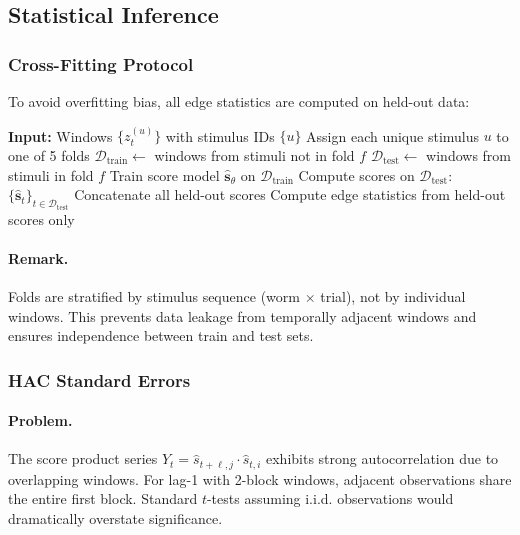 \documentclass{article}
\theoremstyle{plain}
\theoremstyle{definition}
\theoremstyle{remark}
\newcommand{\1}{\mathbf{1}}
\begin{document}
\subsection{Statistical Inference}
\label{app:inference}

\subsubsection{Cross-Fitting Protocol}

To avoid overfitting bias, all edge statistics are computed on held-out data:

\begin{algorithm}[h!]
\caption{5-Fold Cross-Fitting}
\label{alg:crossfit}
\begin{center}
\begin{minipage}{0.85\textwidth}
\begin{algorithmic}[1]
\scriptsize
\STATE \textbf{Input:} Windows $\{z_t^{(u)}\}$ with stimulus IDs $\{u\}$
\STATE Assign each unique stimulus $u$ to one of 5 folds
    \STATE $\mathcal{D}_{\mathrm{train}} \gets$ windows from stimuli not in fold $f$
    \STATE $\mathcal{D}_{\mathrm{test}} \gets$ windows from stimuli in fold $f$
    \STATE Train score model $\widehat{\bm{s}}_\theta$ on $\mathcal{D}_{\mathrm{train}}$
    \STATE Compute scores on $\mathcal{D}_{\mathrm{test}}$: $\{\widehat{\bm{s}}_t\}_{t \in \mathcal{D}_{\mathrm{test}}}$
\ENDFOR
\STATE Concatenate all held-out scores
\STATE Compute edge statistics from held-out scores only
\end{algorithmic}
\end{minipage}
\end{center}
\end{algorithm}

\paragraph{Remark.} Folds are stratified by stimulus sequence (worm $\times$ trial), not by individual windows. This prevents data leakage from temporally adjacent windows and ensures independence between train and test sets.


\subsubsection{HAC Standard Errors}

\paragraph{Problem.}
The score product series $Y_t = \widehat{s}_{t+\ell,j} \cdot \widehat{s}_{t,i}$ exhibits strong autocorrelation due to overlapping windows. For lag-1 with 2-block windows, adjacent observations share the entire first block. Standard $t$-tests assuming i.i.d. observations would dramatically overstate significance.
\end{document}
